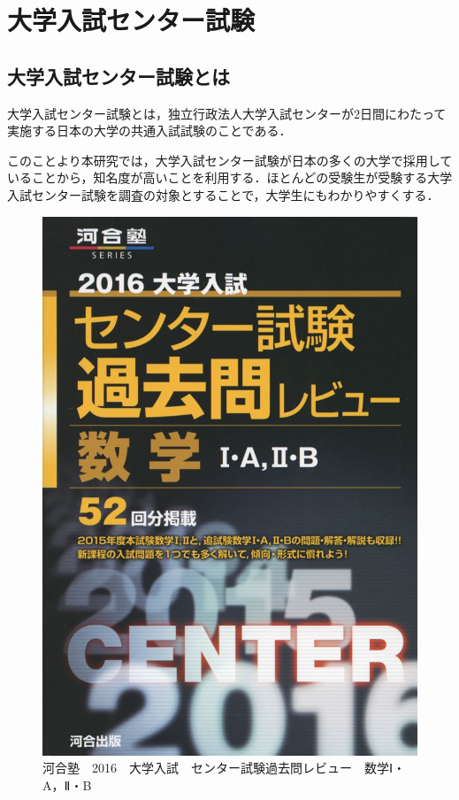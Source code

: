 \chapter{大学入試センター試験}

\section{大学入試センター試験とは}
大学入試センター試験とは，独立行政法人大学入試センターが2日間にわたって実施する日本の大学の共通入試試験のことである．

このことより本研究では，大学入試センター試験が日本の多くの大学で採用していることから，知名度が高いことを利用する．ほとんどの受験生が受験する大学入試センター試験を調査の対象とすることで，大学生にもわかりやすくする．

\begin{figure}[h]
\centering
\includegraphics[width=13cm]{center.jpg}
\caption{河合塾　2016　大学入試　センター試験過去問レビュー　数学Ⅰ・A，Ⅱ・B}\label{写真}
\end{figure}

